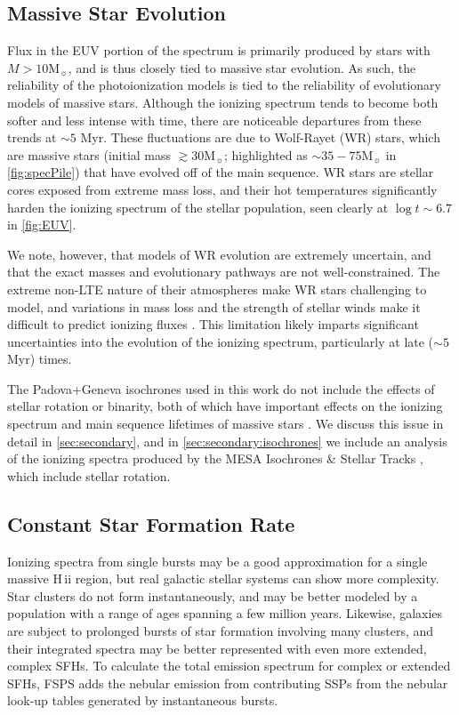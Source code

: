\documentclass[linenumbers, trackchanges, tighten]{aastex61}%
\newcommand{\Fig}[1]{\autoref{fig:#1}}
\newcommand{\Sec}[1]{\autoref{sec:#1}}
\newcommand\Msun{\ensuremath{\mathrm{M_{\sun}}}}
\newcommand{\hii}{H\,{\sc ii}\xspace}
\begin{document}
\subsection{Massive Star Evolution}\label{sec:spectra:stars}

Flux in the EUV portion of the spectrum is primarily produced by stars with $M > 10\Msun$, and is thus closely tied to massive star evolution. As such, the reliability of the photoionization models is tied to the reliability of evolutionary models of massive stars. Although the ionizing spectrum tends to become both softer and less intense with time, there are noticeable departures from these trends at ${\sim}5$ Myr. These fluctuations are due to Wolf-Rayet (WR) stars, which are massive stars (initial mass $\gtrsim 30\Msun$; highlighted as $\sim 35-75 \Msun$ in \Fig{specPile}) that have evolved off of the main sequence. WR stars are stellar cores exposed from extreme mass loss, and their hot temperatures significantly harden the ionizing spectrum of the stellar population, seen clearly at $\log t \sim 6.7$ in \Fig{EUV}.

We note, however, that models of WR evolution are extremely uncertain, and that the exact masses and evolutionary pathways are not well-constrained. The extreme non-LTE nature of their atmospheres make WR stars challenging to model, and variations in mass loss and the strength of stellar winds make it difficult to predict ionizing fluxes \citep[see review by][and references within]{Crowther07}. This limitation likely imparts significant uncertainties into the evolution of the ionizing spectrum, particularly at late (${\sim}5$ Myr) times.

The Padova+Geneva isochrones used in this work do not include the effects of stellar rotation or binarity, both of which have important effects on the ionizing spectrum and main sequence lifetimes of massive stars \citep[e.g.,][]{Levesque12, Eldridge+2012, Stanway+2016}. We discuss this issue in detail in \Sec{secondary}, and in \Sec{secondary:isochrones} we include an analysis of the ionizing spectra produced by the MESA Isochrones \& Stellar Tracks \citep[MIST,][]{Dotter16, Choi16}, which include stellar rotation.

\subsection{Constant Star Formation Rate}\label{sec:spectra:CSFH}

Ionizing spectra from single bursts may be a good approximation for a single massive \hii region, but real galactic stellar systems can show more complexity. Star clusters do not form instantaneously, and may be better modeled by a population with a range of ages spanning a few million years. Likewise, galaxies are subject to prolonged bursts of star formation involving many clusters, and their integrated spectra may be better represented with even more extended, complex SFHs. To calculate the total emission spectrum for complex or extended SFHs, FSPS adds the nebular emission from contributing SSPs from the nebular look-up tables generated by instantaneous bursts.
\end{document}
